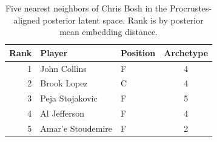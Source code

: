 \begin{table}[htbp]
  \centering\small
  \begin{tabular}{rllc}
    \toprule
    Rank & Player & Position & Archetype \\
    \midrule
    1 & John Collins & F & 4 \\
    2 & Brook Lopez & C & 4 \\
    3 & Peja Stojakovic & F & 5 \\
    4 & Al Jefferson & F & 4 \\
    5 & Amar'e Stoudemire & F & 2 \\
    \bottomrule
  \end{tabular}
  \caption{Five nearest neighbors of Chris Bosh in the Procrustes-aligned posterior latent space. Rank is by posterior mean embedding distance.}
  \label{tab:Chris_Bosh_neighbors}
\end{table}

